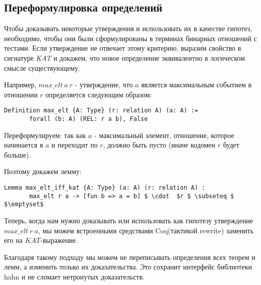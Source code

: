 \documentclass[times
              ]{itmo-student-thesis}
\begin{document}

    \subsection{Переформулировка определений}
   Чтобы доказывать некоторые утверждения и использовать их в качестве гипотез, необходимо, чтобы они были сформулированы в терминах бинарных отношений с тестами.
   Если утверждение не отвечает этому критерию, выразим свойство в сигнатуре \textit{KAT} и докажем, что новое определение эквивалентно в логическом смысле существующему.

   Например, $max\_elt\ a\ r$ - утверждение, что $a$ является максимальным событием в отношении $r$ определяется следующим образом:
   \begin{lstlisting}[mathescape=true, language=coq]
     Definition max_elt {A: Type} (r: relation A) (a: A) :=
       forall (b: A) (REL: r a b), False
   \end{lstlisting}

   Переформулируем: так как $ a $ - максимальный элемент, отношение, которое начинается в $ a $ и переходит по $ r $, должно быть пусто (иначе кодомен $ r $ будет больше).

   Поэтому докажем лемму:
   \begin{lstlisting}[mathescape=true, language=coq]
     Lemma max_elt_iff_kat {A: Type} (a: A) (r: relation A) :
       max_elt r a -> [fun b => a = b] $ \cdot  $r $ \subseteq $ $\emptyset$
   \end{lstlisting}

    Теперь, когда нам нужно доказывать или использовать как гипотезу утверждение $ max\_elt\ r\ a $,
    мы можем встроенными средствами Coq(тактикой rewrite) заменить его на $ KAT $-выражение.

    Благодаря такому подходу мы можем не переписывать определения всех теорем и лемм, а изменить только их доказательства.
    Это сохранит интерфейс библиотеки hahn и не сломает нетронутых доказательств.
\end{document}
